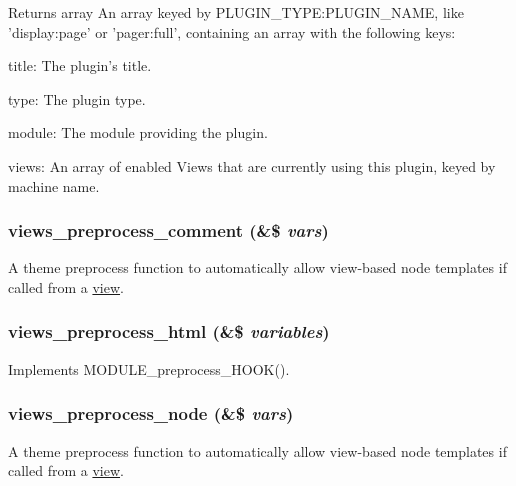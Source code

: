 \begin{DoxyReturn}{Returns}
array An array keyed by PLUGIN\_\-TYPE:PLUGIN\_\-NAME, like 'display:page' or 'pager:full', containing an array with the following keys:
\begin{DoxyItemize}
\item title: The plugin's title.
\item type: The plugin type.
\item module: The module providing the plugin.
\item views: An array of enabled Views that are currently using this plugin, keyed by machine name. 
\end{DoxyItemize}
\end{DoxyReturn}
\hypertarget{views_8module_a79869d9e32f3a55cb67f8024a35ea2ac}{
\subsubsection[{views\_\-preprocess\_\-comment}]{\setlength{\rightskip}{0pt plus 5cm}views\_\-preprocess\_\-comment (\&\$ {\em vars})}}
\label{views_8module_a79869d9e32f3a55cb67f8024a35ea2ac}
A theme preprocess function to automatically allow view-\/based node templates if called from a \hyperlink{classview}{view}. \hypertarget{views_8module_a625ef34d5fe86fa3eb7152359e819d43}{
\subsubsection[{views\_\-preprocess\_\-html}]{\setlength{\rightskip}{0pt plus 5cm}views\_\-preprocess\_\-html (\&\$ {\em variables})}}
\label{views_8module_a625ef34d5fe86fa3eb7152359e819d43}
Implements MODULE\_\-preprocess\_\-HOOK(). \hypertarget{views_8module_aa21197cc54893f9efe75b3200a86d1c2}{
\subsubsection[{views\_\-preprocess\_\-node}]{\setlength{\rightskip}{0pt plus 5cm}views\_\-preprocess\_\-node (\&\$ {\em vars})}}
\label{views_8module_aa21197cc54893f9efe75b3200a86d1c2}
A theme preprocess function to automatically allow view-\/based node templates if called from a \hyperlink{classview}{view}.


